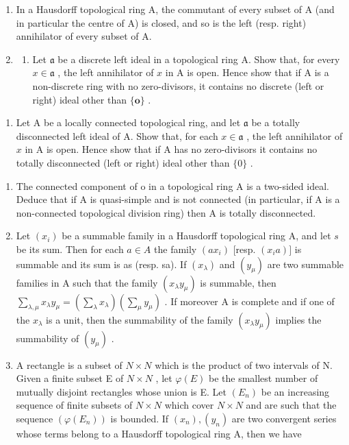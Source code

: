 \BourbakiExerciseGroup

\begin{enumerate}
\def\labelenumi{\arabic{enumi})}
\item
  In a Hausdorff topological ring A, the commutant of every subset of A (and in particular the centre of A) is closed, and so is the left (resp. right) annihilator of every subset of A.
\item
  \begin{enumerate}
  \def\labelenumii{\alph{enumii})}
  \tightlist
  \item
    Let \(\mathfrak{a}\) be a discrete left ideal in a topological ring A. Show that, for every \(x \in \mathfrak{a}\) , the left annihilator of \(x\) in A is open. Hence show that if A is a non-discrete ring with no zero-divisors, it contains no discrete (left or right) ideal other than \(\{\mathbf{o}\}\) .
  \end{enumerate}
\end{enumerate}

\begin{enumerate}
\def\labelenumi{\alph{enumi})}
\setcounter{enumi}{1}
\tightlist
\item
  Let A be a locally connected topological ring, and let \(\mathfrak{a}\) be a totally disconnected left ideal of A. Show that, for each \(x \in \mathfrak{a}\) , the left annihilator of \(x\) in A is open. Hence show that if A has no zero-divisors it contains no totally disconnected (left or right) ideal other than \(\{0\}\) .
\end{enumerate}

\begin{enumerate}
\def\labelenumi{\arabic{enumi})}
\setcounter{enumi}{2}
\item
  The connected component of o in a topological ring A is a two-sided ideal. Deduce that if A is quasi-simple and is not connected (in particular, if A is a non-connected topological division ring) then A is totally disconnected.
\item
  Let \((x_{i})\) be a summable family in a Hausdorff topological ring A, and let \(s\) be its sum. Then for each \(a \in A\) the family \((ax_{i})\) {[}resp. \((x_{i}a)]\) is summable and its sum is as (resp. sa). If \((x_{\lambda})\) and \((y_{\mu})\) are two summable families in A such that the family \((x_{\lambda}y_{\mu})\) is summable, then \(\sum_{\lambda,\mu} x_{\lambda} y_{\mu} = \left( \sum_{\lambda} x_{\lambda} \right) \left( \sum_{\mu} y_{\mu} \right)\) . If moreover A is complete and if one of the \(x_{\lambda}\) is a unit, then the summability of the family \((x_{\lambda}y_{\mu})\) implies the summability of \((y_{\mu})\) .
\item
  A rectangle is a subset of \(N \times N\) which is the product of two intervals of N. Given a finite subset E of \(N \times N\) , let \(\varphi(E)\) be the smallest number of mutually disjoint rectangles whose union is E. Let \((E_n)\) be an increasing sequence of finite subsets of \(N \times N\) which cover \(N \times N\) and are such that the sequence \((\varphi(E_n))\) is bounded. If \((x_n), (y_n)\) are two convergent series whose terms belong to a Hausdorff topological ring A, then we have
\end{enumerate}

